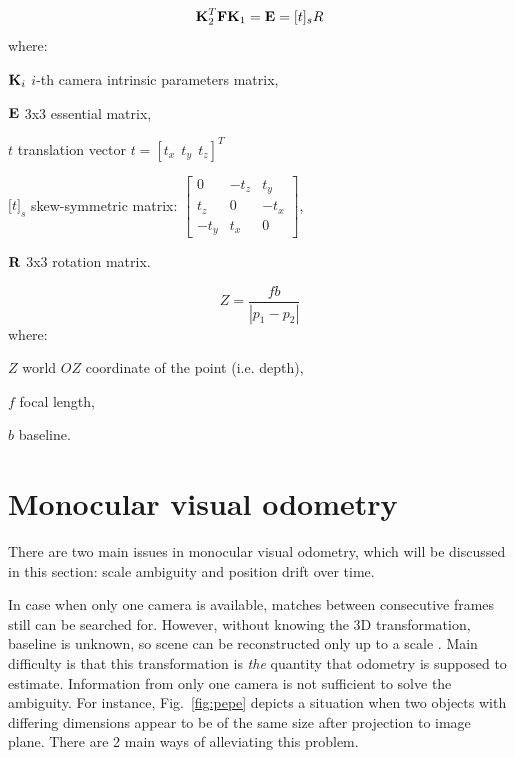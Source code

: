\begin{equation}
\textbf{K}_{2}^{T}\textbf{F}\textbf{K}_{1}=\textbf{E}=[t]_{s}R
\label{eq:ess}
\end{equation}
where:
\begin{eqwhere}[2cm]
	\item[$\textbf{K}_{i}$] $i$-th camera intrinsic parameters matrix,
	\item[$\textbf{E}$] 3x3 essential matrix,
	\item[$t$] translation vector $t=[t_{x}\ \ t_{y}\ \ t_{z}]^T$
	\item[$\lbrack t \rbrack _{s}$] skew-symmetric matrix: $\begin{bmatrix}
		0 & -t_{z} & t_{y} \\ 
		t_{z} & 0 & -t_{x} \\ 
		-t_{y} & t_{x} & 0
	\end{bmatrix}$,
	\item[$\textbf{R}$] 3x3 rotation matrix.
\end{eqwhere}

\begin{equation}
Z = \frac{fb}{|p_{1}-p_{2}|}
\label{eq:disparity}
\end{equation}
where:
\begin{eqwhere}[2cm]
	\item[$Z$] world $OZ$ coordinate of the point (i.e. depth),
	\item[$f$] focal length,
	\item[$b$] baseline.
\end{eqwhere}


\section{Monocular visual odometry}
\label{sec:mono}

There are two main issues in monocular visual odometry, which will be discussed in this section: scale ambiguity and position drift over time.

In case when only one camera is available, matches between consecutive frames still can be searched for. However, without knowing the 3D transformation, baseline is unknown, so scene can be reconstructed only up to a scale \cite{hartley2003multiple} \cite{szeliski}. Main difficulty is that this transformation is \textit{the} quantity that odometry is supposed to estimate. Information from only one camera is not sufficient to solve the ambiguity. For instance, Fig.~\ref{fig:pepe} depicts a situation when two objects with differing dimensions appear to be of the same size after projection to image plane. There are 2 main ways of alleviating this problem.

